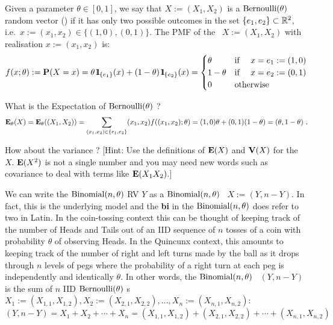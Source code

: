 \begin{model}[$\bernoulli(\theta)$ \rv]
Given a parameter $\theta \in [0,1]$, we say that $X := (X_1,X_2)$ is a $\bernoulli(\theta)$ random vector (\rv) if it has only two possible outcomes in the set $\{e_1,e_2\} \subset \mathbb{R}^2$, i.e.~$x:=(x_1,x_2) \in \{(1,0),(0,1)\}$.  The PMF of the \rv~$X:= (X_1,X_2)$ with realisation $x:=(x_1,x_2)$ is:
\[
f(x;\theta) := \mathbf{P}(X=x) = \theta \, {1}\mspace{-11 mu}{1}_{\{e_1\}}(x) + (1-\theta) \, {1}\mspace{-11 mu}{1}_{\{e_2\}}(x) =
\begin{cases}
\theta & \text{if } \quad x=e_1:=(1,0) \\
1- \theta & \text{if } \quad x=e_2:=(0,1) \\
0 & \text{otherwise}
\end{cases}
\]
\end{model}


\begin{classwork}
What is the Expectation of $\bernoulli(\theta)$ \rv?
\[
\mathbf{E}_{\theta}(X) = \mathbf{E}_{\theta}((X_1,X_2)) = \sum_{(x_1,x_2) \in \{e_1,e_2\}} (x_1,x_2) f((x_1,x_2);\theta) = (1,0) \theta + (0,1) (1-\theta) = (\theta,1-\theta) \ .
\]

How about the variance ? [Hint: Use the definitions of $\mathbf{E}(X)$ and $\mathbf{V}(X)$ for the \rv~$X$.  $\mathbf{E}(X^2)$ is not a single number and you may need new words such as covariance to deal with terms like $\mathbf{E}(X_1 X_2)$.]
\end{classwork}

We can write the $\mbox{{\rm Binomial}}(n,\theta)$ RV $Y$ as a $\mbox{{\rm Binomial}}(n,\theta)$ \rv~$X:=(Y,n-Y)$.  In fact, this is the underlying model and the {\bf bi} in the $\mbox{{\rm Binomial}}(n,\theta)$ does refer to two in Latin.  In the coin-tossing context this can be thought of keeping track of the number of Heads and Tails out of an IID sequence of $n$ tosses of a coin with probability $\theta$ of observing Heads.  In the Quincunx context, this amounts to keeping track of the number of right and left turns made by the ball as it drops through $n$ levels of pegs where the probability of a right turn at each peg is independently and identically $\theta$.  In other words, the $\mbox{{\rm Binomial}}(n,\theta)$ \rv~$(Y,n-Y)$ is the sum of $n$ IID $\bernoulli(\theta)$ {\rv}s $X_1:=(X_{1,1},X_{1,2}), X_2:=(X_{2,1},X_{2,2}), \ldots, X_n:=(X_{n,1},X_{n,2})$:
\[
(Y,n-Y) = X_1+X_2+\cdots + X_n = (X_{1,1},X_{1,2}) + (X_{2,1},X_{2,2}) + \cdots + (X_{n,1},X_{n,2})
\]


